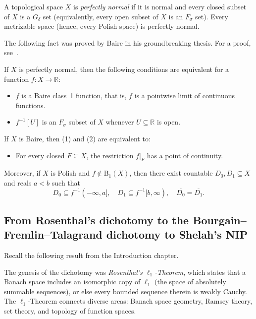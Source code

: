 A topological space $X$ is \emph{perfectly normal} if it is normal and every closed subset of $X$ is a $G_\delta$ set (equivalently, every open subset of $X$ is an $F_\sigma$ set).
Every metrizable space (hence, every Polish space) is perfectly normal.

The following fact was proved by Baire in his groundbreaking thesis.
For a proof, see~\cite[Section 10]{Todorcevic_1997_TopicsTop}.

\begin{fact}[Baire]\label{baire}
    If $X$ is perfectly normal, then the following conditions are equivalent for a function $f\colon X\to \mathbb{R}$:
    \begin{itemize}
        \item[(1)] $f$ is a Baire class~1 function, that is, $f$ is a pointwise limit of continuous functions.
        \item[(2)] $f^{-1}[U]$ is an $F_\sigma$ subset of $X$ whenever $U\subseteq\mathbb{R}$ is open.
    \end{itemize}
    If $X$ is Baire, then (1) and (2) are equivalent to:
    \begin{itemize}
        \item[(3)] For every closed $F\subseteq X$, the restriction $f|_F$ has a point of continuity.
    \end{itemize}
    Moreover, if $X$ is Polish and $f\notin \mathrm{B}_1(X)$, then there exist countable $D_0,D_1\subseteq X$ and reals $a<b$ such that
    \[
    D_0\subseteq f^{-1}(-\infty,a],
    \quad
    D_1\subseteq f^{-1}[b,\infty),
    \quad
    \overline{D_0}=\overline{D_1}.
    \]
\end{fact}

\subsection{From Rosenthal's dichotomy to the Bourgain--Fremlin--Talagrand dichotomy to Shelah's NIP}

Recall the following result from the Introduction chapter.

\rosenthaldichotomy*

The genesis of the dichotomy was \emph{Rosenthal's $\ell_1$-Theorem}, which states that a Banach space includes an isomorphic copy of $\ell_1$ (the space of absolutely summable sequences), or else every bounded sequence therein is weakly Cauchy.
The $\ell_1$-Theorem connects diverse areas:
Banach space geometry, Ramsey theory, set theory, and topology of function spaces.

